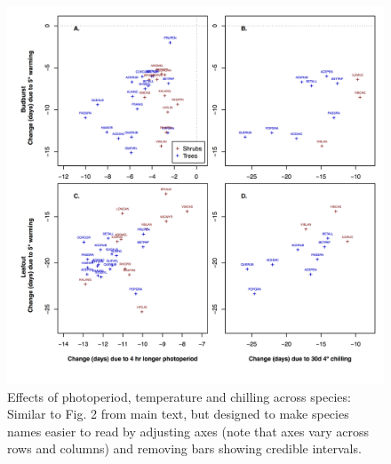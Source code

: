 \documentclass{article}
\begin{document}
\begin{figure}
\label{fig:figS5}
\includegraphics[width=1\textwidth]{Fig2_4panel_ZoomSupp.png}
\caption{Effects of photoperiod, temperature and chilling across species: Similar to Fig. 2 from main text, but designed to make species names easier to read by adjusting axes (note that axes vary across rows and columns) and removing bars showing credible intervals. }
\end{figure}
\end{document}
